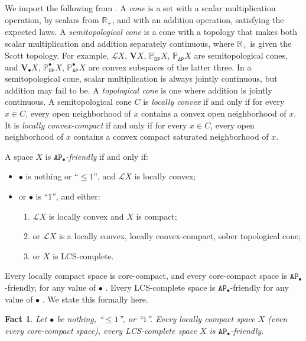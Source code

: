 \documentclass[preprint,12pt]{elsarticle}
\newcommand{\Rp}{\mathbb{R}_+}
\newcommand\Lform{\mathcal L}
\newcommand\Pred{\mathbb{P}}
\newcommand\Angel{{\mathtt{A}}}
\newcommand\Demon{{\mathtt{D}}}
\newcommand\Nature{{\mathtt{P}}}
\newcommand\AN{{\Angel\Nature}}
\newcommand\DN{{\Demon\Nature}}
\newcommand\Val{{\mathbf V}}
\newtheorem{fact}[theorem]{Fact}
\begin{document}
We import the following from \cite{Keimel:topcones2}.  A \emph{cone}
is a set with a scalar multiplication operation, by scalars from
$\Rp$, and with an addition operation, satisfying the expected laws.
A \emph{semitopological cone} is a cone with a topology that makes
both scalar multiplication and addition separately continuous, where
$\Rp$ is given the Scott topology.  For example, $\Lform X$, $\Val X$,
$\Pred_\DN X$, $\Pred_\AN X$ are semitopological cones, and
$\Val_\bullet X$, $\Pred_\DN^\bullet X$, $\Pred_\AN^\bullet X$ are
convex subspaces of the latter three.  In a semitopological cone,
scalar multiplication is always jointly continuous, but addition may
fail to be.  A \emph{topological cone} is one where addition is
jointly continuous.  A semitopological cone $C$ is \emph{locally
  convex} if and only if for every $x \in C$, every open neighborhood
of $x$ contains a convex open neighborhood of $x$.  It is
\emph{locally convex-compact} if and only if for every $x \in C$,
every open neighborhood of $x$ contains a convex compact saturated
neighborhood of $x$.

A space $X$ is \emph{$\AN_\bullet$-friendly}
\cite[Definition~1]{JGL:mscs16:errata}
if and only if:
\begin{itemize}[label=---]
\item $\bullet$ is nothing or ``$\leq 1$'', and $\Lform X$ is locally
  convex;
\item or $\bullet$ is ``$1$'', and either:
  \begin{enumerate}
  \item $\Lform X$ is locally convex and $X$ is compact;
  \item or $\Lform X$ is a locally convex, locally convex-compact,
    sober topological cone;
  \item or $X$ is LCS-complete.
  \end{enumerate}
\end{itemize}
Every locally compact space is core-compact, and every core-compact
space is $\AN_\bullet$-friendly, for any value of $\bullet$
\cite[Remark~2]{JGL:mscs16:errata}.
Every LCS-complete space is $\AN_\bullet$-friendly for any value of
$\bullet$
\cite[Remark~3]{JGL:mscs16:errata}.
We state this formally here.
\begin{fact}
  \label{fact:assum}
  Let $\bullet$ be nothing, ``$\leq 1$'', or ``$1$''.  Every locally
  compact space $X$ (even every core-compact space), every
  LCS-complete space $X$ is $\AN_\bullet$-friendly.
\end{fact}
\end{document}
